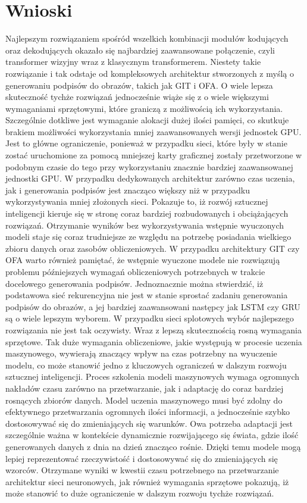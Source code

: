 \newpage %
\section{Wnioski}
Najlepszym rozwiązaniem spośród wszelkich kombinacji modułów kodujących oraz dekodujących okazało się najbardziej zaawansowane połączenie, czyli transformer wizyjny wraz z klasycznym transformerem. Niestety takie rozwiązanie i tak odstaje od kompleksowych architektur stworzonych z myślą o generowaniu podpisów do obrazów, takich jak GIT i OFA. O wiele lepsza skuteczność tychże rozwiązań jednocześnie wiąże się z o wiele większymi wymaganiami sprzętowymi, które graniczą z możliwością ich wykorzystania. Szczególnie dotkliwe jest wymaganie alokacji dużej ilości pamięci, co skutkuje brakiem możliwości wykorzystania mniej zaawansowanych wersji jednostek GPU. Jest to główne ograniczenie, ponieważ w przypadku sieci, które były w stanie zostać uruchomione za pomocą mniejszej karty graficznej zostały przetworzone w podobnym czasie do tego przy wykorzystaniu znacznie bardziej zaawansowanej jednostki GPU. W przypadku dedykowanych architektur zarówno czas uczenia, jak i generowania podpisów jest znacząco większy niż w przypadku wykorzystywania mniej złożonych sieci. Pokazuje to, iż rozwój sztucznej inteligencji kieruje się w stronę coraz bardziej rozbudowanych i obciążających rozwiązań. Otrzymanie wyników bez wykorzystywania wstępnie wyuczonych modeli staje się coraz trudniejsze ze względu na potrzebę posiadania wielkiego zbioru danych oraz zasobów obliczeniowych. W przypadku architektury GIT czy OFA warto również pamiętać, że wstępnie wyuczone modele nie rozwiązują problemu późniejszych wymagań obliczeniowych potrzebnych w trakcie docelowego generowania podpisów. Jednoznacznie można stwierdzić, iż podstawowa sieć rekurencyjna nie jest w stanie sprostać zadaniu generowania podpisów do obrazów, a jej bardziej zaawansowani następcy jak LSTM czy GRU są o wiele lepszym wyborem. W przypadku sieci splotowych wybór najlepszego rozwiązania nie jest tak oczywisty. Wraz z lepszą skutecznością rosną wymagania sprzętowe. Tak duże wymagania obliczeniowe, jakie występują w procesie uczenia maszynowego, wywierają znaczący wpływ na czas potrzebny na wyuczenie modelu, co może stanowić jedno z kluczowych ograniczeń w dalszym rozwoju sztucznej inteligencji. Proces szkolenia modeli maszynowych wymaga ogromnych nakładów czasu zarówno na przetwarzanie, jak i adaptację do coraz bardziej rosnących zbiorów danych. Model uczenia maszynowego musi być zdolny do efektywnego przetwarzania ogromnych ilości informacji, a jednocześnie szybko dostosowywać się do zmieniających się warunków. Owa potrzeba adaptacji jest szczególnie ważna w kontekście dynamicznie rozwijającego się świata, gdzie ilość generowanych danych z dnia na dzień znacząco rośnie. Dzięki temu modele mogą lepiej reprezentować rzeczywistość i dostosowywać się do zmieniających się wzorców. Otrzymane wyniki w kwestii czasu potrzebnego na przetwarzanie architektur sieci neuronowych, jak również wymagania sprzętowe pokazują, iż może stanowić to duże ograniczenie w dalszym rozwoju tychże rozwiązań.
